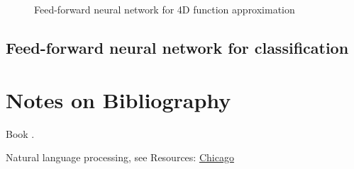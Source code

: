 \begin{refsection}
\begin{figure}
\caption{Feed-forward neural network for 4D function approximation}
\end{figure}

\subsection{Feed-forward neural network for classification}


\section{Notes on Bibliography}

Book \cite{goodfellow2016deep}.

Natural language processing, see \cite{manning1999foundations}
Resources: \href{http://ttic.uchicago.edu/~shubhendu/Pages/CMSC35246.html}{Chicago}

\printbibliography
\end{refsection}
